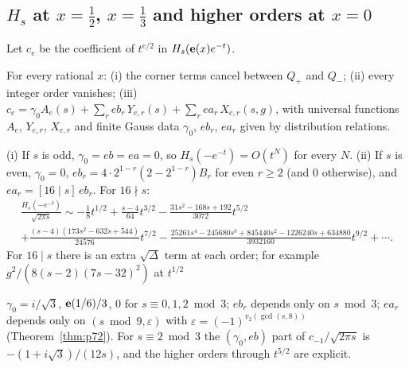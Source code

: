 \subsection{$H_s$ at $x=\tfrac12$, $x=\tfrac13$ and higher orders at $x=0$}\label{sec:Hsx}
Let $c_e$ be the coefficient of $t^{e/2}$ in $H_s(\mathbf{e}(x)e^{-t})$.
\begin{proposition}\label{prop:R123}
For every rational $x$: (i) the corner terms cancel between $Q_+$ and $Q_-$; (ii) every integer order vanishes; (iii) $c_e=\gamma_0A_e(s)+\sum_r eb_r\,Y_{e,r}(s)+\sum_r ea_r\,X_{e,r}(s,g)$,
with universal functions $A_e$, $Y_{e,r}$, $X_{e,r}$ and finite Gauss data $\gamma_0$, $eb_r$, $ea_r$ given by distribution relations.
\end{proposition}
\begin{proposition}[$x=\tfrac12$]\label{prop:xhalf}
(i) If $s$ is odd, $\gamma_0=eb=ea=0$, so $H_s(-e^{-t})=O(t^N)$ for every $N$. (ii) If $s$ is even, $\gamma_0=0$, $eb_r=4\cdot2^{1-r}(2-2^{1-r})B_r$ for even $r\ge2$ (and $0$ otherwise), and
$ea_r=[16\mid s]\,eb_r$. For $16\nmid s$:
\begin{multline*}\frac{H_s(-e^{-t})}{\sqrt{2\pi s}}\sim-\tfrac18t^{1/2}+\tfrac{s-4}{64}t^{3/2}-\tfrac{31s^2-168s+192}{3072}t^{5/2}\\+\tfrac{(s-4)(173s^2-632s+544)}{24576}t^{7/2}
-\tfrac{25261s^4-245680s^3+845440s^2-1226240s+634880}{3932160}t^{9/2}+\cdots.\end{multline*}
For $16\mid s$ there is an extra $\sqrt\Delta$ term at each order; for example $g^2/(8(s-2)(7s-32)^2)$ at $t^{1/2}$
\end{proposition}
\begin{proposition}[$x=\tfrac13$]\label{prop:xthird}
$\gamma_0=i/\sqrt3$, $\mathbf{e}(1/6)/3$, $0$ for $s\equiv0,1,2\bmod3$; $eb_r$ depends only on $s\bmod3$; $ea_r$ depends only on $(s\bmod9,\varepsilon)$ with
$\varepsilon=(-1)^{v_2(\gcd(s,8))}$ (Theorem~\ref{thm:p72}). For $s\equiv2\bmod3$ the $(\gamma_0,eb)$ part of $c_{-1}/\sqrt{2\pi s}$ is $-(1+i\sqrt3)/(12s)$, and
the higher orders through $t^{5/2}$ are explicit.
\end{proposition}
